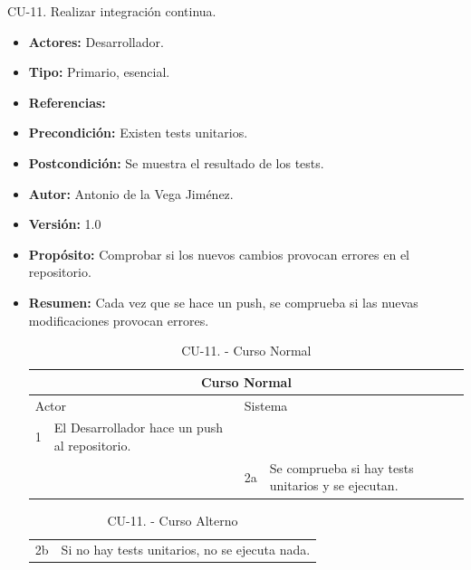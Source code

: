  \item CU-11. Realizar integración continua.
  \begin{itemize}
    \item \textbf{Actores:} Desarrollador.
    \item \textbf{Tipo:} Primario, esencial.
    \item \textbf{Referencias:}
    \item \textbf{Precondición:} Existen tests unitarios.
    \item \textbf{Postcondición:} Se muestra el resultado de los tests.
    \item \textbf{Autor:} Antonio de la Vega Jiménez.
    \item \textbf{Versión:} 1.0
    \item \textbf{Propósito:} Comprobar si los nuevos cambios provocan errores en el repositorio.
    \item \textbf{Resumen:} Cada vez que se hace un push, se comprueba si las nuevas modificaciones provocan errores.
    \begin{table}[H]
      \centering
      \begin{tabularx}{\textwidth}{|l|X|l|X|}
        \hline
        \multicolumn{4}{|c|}{\cellcolor[HTML]{C0C0C0}Curso Normal}                                                 \\ \hline
        \multicolumn{2}{|l|}{\cellcolor[HTML]{EFEFEF}Actor} & \multicolumn{2}{l|}{\cellcolor[HTML]{EFEFEF}Sistema} \\ \hline
        1                         & El Desarrollador hace un push al repositorio.                        &                            &                         \\ \hline
                                  &                         & 2a                          & Se comprueba si hay tests unitarios y se ejecutan.                       \\ \hline

                                  
      \end{tabularx}
      \caption{CU-11. - Curso Normal}
      \label{my-label}
    \end{table}
    \begin{table}[H]
      \centering
      \begin{tabularx}{\textwidth}{|l|X|}
       \hline
       \rowcolor[HTML]{C0C0C0} 
       \multicolumn{2}{|l|}{\cellcolor[HTML]{C0C0C0}Curso Alterno} \\ \hline
       \rowcolor[HTML]{FFFFFF} 
              2b                      & Si no hay tests unitarios, no se ejecuta nada.                            \\ \hline
      \end{tabularx}
      \caption{CU-11. - Curso Alterno}
      \label{my-label}
    \end{table}
  \end{itemize}
